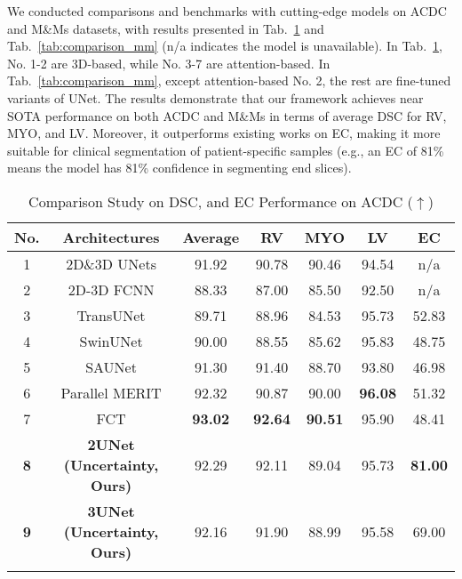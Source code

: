 We conducted comparisons and benchmarks with cutting-edge models on ACDC and M\&Ms datasets, with results presented in Tab.~\ref{tab:comparison_acdc} and Tab.~\ref{tab:comparison_mm} (n/a indicates the model is unavailable). In Tab.~\ref{tab:comparison_acdc}, No. 1-2 are 3D-based, while No. 3-7 are attention-based. In Tab.~\ref{tab:comparison_mm}, except attention-based No. 2, the rest are fine-tuned variants of UNet. The results demonstrate that our framework achieves near SOTA performance on both ACDC and M\&Ms in terms of average DSC for RV, MYO, and LV. Moreover, it outperforms existing works on EC, making it more suitable for clinical segmentation of patient-specific samples (e.g., an EC of 81\% means the model has 81\% confidence in segmenting end slices).

\begin{table}[htb!]
\caption{Comparison Study on DSC, and EC Performance on ACDC ($\uparrow$)}
\centering
\begin{tabular}{ccccccc}
\toprule
No. & Architectures & Average & RV & MYO  & LV & EC\\ 
\midrule
1 & 2D\&3D UNets \cite{isensee2018automatic} &91.92 &90.78 &90.46 &94.54 & n/a \\
2 & 2D-3D FCNN \cite{patravali20182d} &88.33 &87.00 &85.50 &92.50 & n/a \\
3 & TransUNet \cite{chen2021transunet}   & 89.71   & 88.96  & 84.53    & 95.73  &52.83 \\
4 & SwinUNet \cite{cao2022swin}      & 90.00  & 88.55 & 85.62  & 95.83  &48.75  \\
5 & SAUNet \cite{sun2020saunet}       & 91.30   & 91.40  & 88.70   & 93.80  & 46.98 \\ 
6 & Parallel MERIT \cite{rahman2024multi}   & 92.32   &  90.87  & 90.00   & \textbf{96.08}  &  51.32\\ 
7 & FCT  \cite{tragakis2023fully}  & \textbf{93.02}   & \textbf{92.64}  & \textbf{90.51}  & 95.90  & 48.41\\
\midrule
\textbf{8} & \textbf{2UNet (Uncertainty, Ours)} &92.29  &92.11  &89.04  &95.73  &\textbf{81.00} \\
\textbf{9} & \textbf{3UNet (Uncertainty, Ours)} &92.16  &91.90  &88.99  &95.58  &69.00 \\
\bottomrule
\label{tab:comparison_acdc}
\end{tabular}
\end{table}


